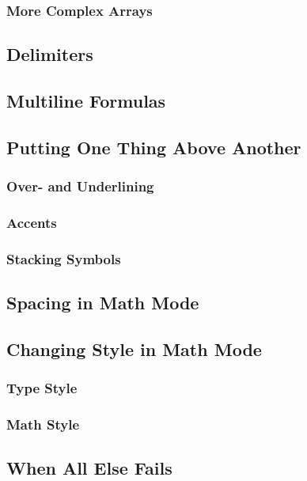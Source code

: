 \subsubsection{More Complex Arrays}


\subsection{Delimiters}


\subsection{Multiline Formulas}


\subsection{Putting One Thing Above Another}
\subsubsection{Over- and Underlining}
\subsubsection{Accents}
\subsubsection{Stacking Symbols}


\subsection{Spacing in Math Mode}


\subsection{Changing Style in Math Mode}
\subsubsection{Type Style}
\subsubsection{Math Style}


\subsection{When All Else Fails}